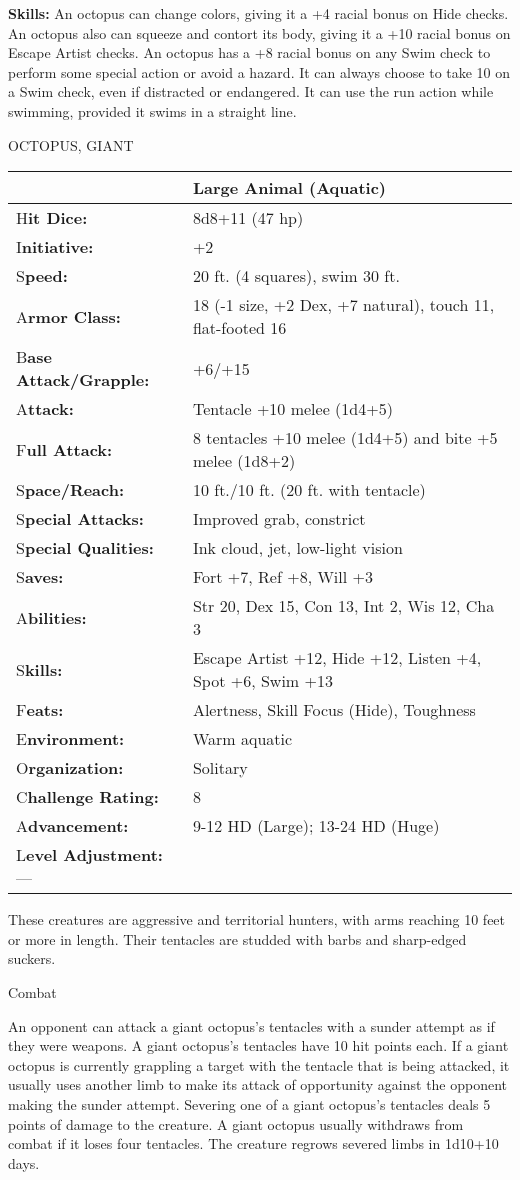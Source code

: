 \documentclass{article}
\begin{document}
\textbf{Skills:} An octopus can change colors, giving it a +4 racial bonus on Hide 
checks. An octopus also can squeeze and contort its body, giving it a +10 racial 
bonus on Escape Artist checks. An octopus has a +8 racial bonus on any Swim check 
to perform some special action or avoid a hazard. It can always choose to take 
10 on a Swim check, even if distracted or endangered. It can use the run action 
while swimming, provided it swims in a straight line.

\vspace{12pt}
OCTOPUS, GIANT

\begin{tabular}{|>{\raggedright}p{90pt}|>{\raggedright}p{235pt}|}
\hline
  & Large Animal (Aquatic)\tabularnewline
\hline
H\textbf{it Dice:} & 8d8+11 (47 hp)\tabularnewline
\hline
I\textbf{nitiative:} & +2\tabularnewline
\hline
S\textbf{peed:} & 20 ft. (4 squares), swim 30 ft.\tabularnewline
\hline
A\textbf{rmor Class:} & 18 (-1 size, +2 Dex, +7 natural), touch 11, flat-footed 
16\tabularnewline
\hline
B\textbf{ase Attack/Grapple:} & +6/+15\tabularnewline
\hline
A\textbf{ttack:} & Tentacle +10 melee (1d4+5)\tabularnewline
\hline
F\textbf{ull Attack:} & 8 tentacles +10 melee (1d4+5) and bite +5 melee (1d8+2)\tabularnewline
\hline
S\textbf{pace/Reach:} & 10 ft./10 ft. (20 ft. with tentacle)\tabularnewline
\hline
S\textbf{pecial Attacks:} & Improved grab, constrict\tabularnewline
\hline
S\textbf{pecial Qualities:} & Ink cloud, jet, low-light vision\tabularnewline
\hline
S\textbf{aves:} & Fort +7, Ref +8, Will +3\tabularnewline
\hline
A\textbf{bilities:} & Str 20, Dex 15, Con 13, Int 2, Wis 12, Cha 3\tabularnewline
\hline
S\textbf{kills:} & Escape Artist +12, Hide +12, Listen +4, Spot +6, Swim +13\tabularnewline
\hline
F\textbf{eats:} & Alertness, Skill Focus (Hide), Toughness\tabularnewline
\hline
E\textbf{nvironment:} & Warm aquatic\tabularnewline
\hline
O\textbf{rganization:} & Solitary\tabularnewline
\hline
C\textbf{hallenge Rating:} & 8\tabularnewline
\hline
A\textbf{dvancement:} & 9-12 HD (Large); 13-24 HD (Huge)\tabularnewline
\hline
L\textbf{evel Adjustment:}--- & \tabularnewline
\hline
\end{tabular}

These creatures are aggressive and territorial hunters, with arms reaching 10 feet 
or more in length. Their tentacles are studded with barbs and sharp-edged suckers.

Combat

An opponent can attack a giant octopus's tentacles with a sunder attempt as if 
they were weapons. A giant octopus's tentacles have 10 hit points each. If a giant 
octopus is currently grappling a target with the tentacle that is being attacked, 
it usually uses another limb to make its attack of opportunity against the opponent 
making the sunder attempt. Severing one of a giant octopus's tentacles deals 5 
points of damage to the creature. A giant octopus usually withdraws from combat 
if it loses four tentacles. The creature regrows severed limbs in 1d10+10 days.
\end{document}
